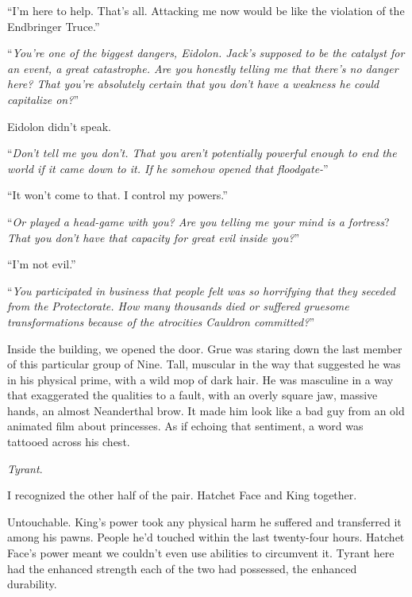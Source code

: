 ``I'm here to help.  That's all.  Attacking me now would be like the violation of the Endbringer Truce.''



``\emph{You're one of the biggest dangers, Eidolon.  Jack's supposed to be the catalyst for an event, a great catastrophe.  Are you honestly telling me that there's no danger here?  That you're absolutely certain that you don't have a weakness he could capitalize on?}''



Eidolon didn't speak.



``\emph{Don't tell me you don't.  That you aren't potentially powerful enough to end the world if it came down to it.  If he somehow opened that floodgate-}''



``It won't come to that.  I control my powers.''



``\emph{Or played a head-game with you?  Are you telling me your mind is a fortress}?  \emph{That you don't have that capacity for great evil inside you?}''



``I'm not evil.''



``\emph{You participated in business that people felt was so horrifying that they seceded from the Protectorate.  How many thousands died or suffered gruesome transformations because of the atrocities Cauldron committed?}''



Inside the building, we opened the door.  Grue was staring down the last member of this particular group of Nine.  Tall, muscular in the way that suggested he was in his physical prime, with a wild mop of dark hair.  He was masculine in a way that exaggerated the qualities to a fault, with an overly square jaw, massive hands, an almost Neanderthal brow.  It made him look like a bad guy from an old animated film about princesses.  As if echoing that sentiment, a word was tattooed across his chest.



\emph{Tyrant}.



I recognized the other half of the pair.  Hatchet Face and King together.



Untouchable.  King's power took any physical harm he suffered and transferred it among his pawns.  People he'd touched within the last twenty-four hours.  Hatchet Face's power meant we couldn't even use abilities to circumvent it.  Tyrant here had the enhanced strength each of the two had possessed, the enhanced durability.



